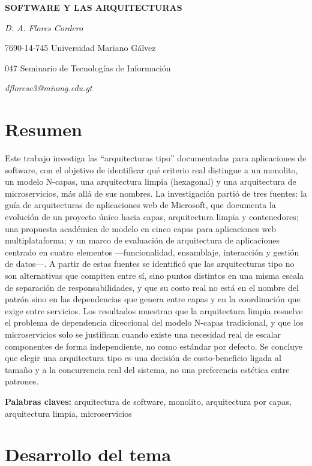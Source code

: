 \documentclass[
  spanish,
  12pt,
  letterpaper,
]{article}
\author{}
\date{}
\begin{document}
\begin{center}

\textbf{SOFTWARE Y LAS ARQUITECTURAS}

\emph{D. A. Flores Cordero}

7690-14-745 Universidad Mariano Gálvez

047 Seminario de Tecnologías de Información

\emph{dfloresc3@miumg.edu.gt}

\end{center}

\section{Resumen}\label{resumen}

Este trabajo investiga las ``arquitecturas tipo'' documentadas para
aplicaciones de software, con el objetivo de identificar qué criterio
real distingue a un monolito, un modelo N-capas, una arquitectura limpia
(hexagonal) y una arquitectura de microservicios, más allá de sus
nombres. La investigación partió de tres fuentes: la guía de
arquitecturas de aplicaciones web de Microsoft, que documenta la
evolución de un proyecto único hacia capas, arquitectura limpia y
contenedores; una propuesta académica de modelo en cinco capas para
aplicaciones web multiplataforma; y un marco de evaluación de
arquitectura de aplicaciones centrado en cuatro elementos
---funcionalidad, ensamblaje, interacción y gestión de datos---. A
partir de estas fuentes se identificó que las arquitecturas tipo no son
alternativas que compiten entre sí, sino puntos distintos en una misma
escala de separación de responsabilidades, y que su costo real no está
en el nombre del patrón sino en las dependencias que genera entre capas
y en la coordinación que exige entre servicios. Los resultados muestran
que la arquitectura limpia resuelve el problema de dependencia
direccional del modelo N-capas tradicional, y que los microservicios
solo se justifican cuando existe una necesidad real de escalar
componentes de forma independiente, no como estándar por defecto. Se
concluye que elegir una arquitectura tipo es una decisión de
costo-beneficio ligada al tamaño y a la concurrencia real del sistema,
no una preferencia estética entre patrones.

\textbf{Palabras claves:} arquitectura de software, monolito,
arquitectura por capas, arquitectura limpia, microservicios

\section{Desarrollo del tema}\label{desarrollo-del-tema}
\end{document}
